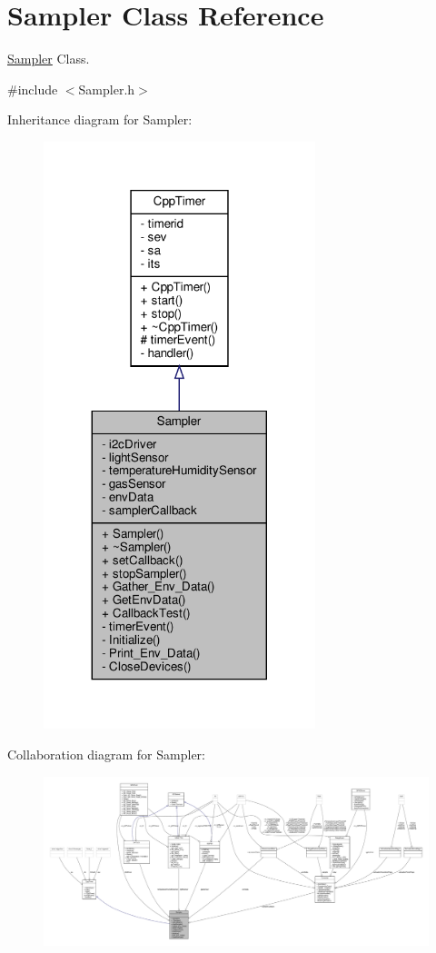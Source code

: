 \hypertarget{classSampler}{}\section{Sampler Class Reference}
\label{classSampler}


\hyperlink{classSampler}{Sampler} Class.  




{\ttfamily \#include $<$Sampler.\+h$>$}



Inheritance diagram for Sampler\+:
\nopagebreak
\begin{figure}[H]
\begin{center}
\leavevmode
\includegraphics[width=224pt]{classSampler__inherit__graph}
\end{center}
\end{figure}


Collaboration diagram for Sampler\+:
\nopagebreak
\begin{figure}[H]
\begin{center}
\leavevmode
\includegraphics[width=350pt]{classSampler__coll__graph}
\end{center}
\end{figure}

